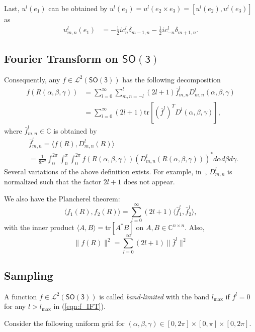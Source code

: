 \documentclass{ieeetran}
\newcommand{\pair}[1]{\ensuremath{\langle #1 \rangle}}
\newcommand{\refeqn}[1]{(\ref{eqn:#1})}
\newcommand{\trs}[1]{\mathrm{tr}\ensuremath{[#1]}}
\newcommand{\SO}{\ensuremath{\mathsf{SO(3)}}}
\newcommand{\Cp}{\ensuremath{\mathbb{C}}}
\begin{document}
Last, $u^l(e_1)$ can be obtained by $u^l(e_1)=u^l(e_2\times e_3)=[u^l(e_2), u^l(e_3)]$ as
\begin{align}
u^l_{m,n}(e_1) 
& = -\frac{1}{2}i c^l_n \delta_{m-1,n}-\frac{1}{2}i c^l_{-n} \delta_{m+1,n}.
\end{align}

\subsection{Fourier Transform on $\SO$}


Consequently, any $f\in\mathcal{L}^2(\SO)$ has the following decomposition
\begin{align}
f(R(\alpha,\beta,\gamma)) &= \sum_{l=0}^\infty \sum_{m,n=-l}^l (2l+1)\bar f^l_{m,n} D^l_{m,n}(\alpha,\beta,\gamma)\nonumber\\
&= \sum_{l=0}^\infty (2l+1)\trs{(\bar f^l)^T D^l(\alpha,\beta,\gamma)},\label{eqn:f_IFT}
\end{align}
where $\bar f^l_{m,n}\in\Cp$ is obtained by
\begin{align}
& \bar f^l_{m,n}=\pair{ f(R), D^l_{m,n}(R)}\nonumber\\
& =\frac{1}{8\pi^2}\int_0^{2\pi}\int_{0}^\pi\int_0^{2\pi} f(R(\alpha,\beta,\gamma)) (D^{l}_{m,n}(R(\alpha,\beta,\gamma)))^*d\alpha d\beta d\gamma.\label{eqn:f_FT}
\end{align}
Several variations of the above definition exists. For example, in~\cite{KosRocJFAA08}, $D^l_{m,n}$ is normalized such that the factor $2l+1$ does not appear.

We also have the Plancherel theorem:
\[
\pair{f_1(R), f_2(R)} = \sum_{l=0}^\infty (2l+1)\pair{\bar f_1^l, \bar f_2^l},
\]
with the inner product $\pair{A,B}=\trs{A^*B}$ on $A,B\in\Cp^{n\times n}$. Also, 
\[
\| f(R)\|^2 = \sum_{l=0}^\infty (2l+1)\|\bar f^l\|^2
\]



\subsection{Sampling}

A function $f\in\mathcal{L}^2(\SO)$ is called \textit{band-limited} with the band $l_{\max}$ if $f^l=0$ for any $l>l_{\max}$ in \refeqn{f_IFT}.

Consider the following uniform grid for $(\alpha,\beta,\gamma)\in[0,2\pi]\times[0,\pi]\times[0,2\pi]$.



\end{document}
